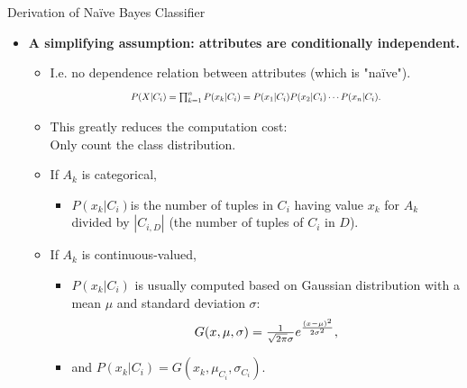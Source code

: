 \begin{frame}{Derivation of Naïve Bayes Classifier}
	\begin{itemize}
		\item \textbf{A simplifying assumption: attributes are {\color{airforceblue}conditionally independent}.}
		      \begin{itemize}
			      \item I.e. no dependence relation between attributes (which is "naïve").
			            \begin{align*}
				            \resizebox{7cm}{!}{%
					            $P(X|C_i) = \prod_{k=1}^{n} P(x_k|C_i) = P(x_1|C_i)P(x_2|C_i)\cdots P(x_n|C_i).$}
			            \end{align*}
			      \item This greatly reduces the computation cost:\\
			            Only count the class distribution.
			      \item If $A_k$ is categorical,
			            \begin{itemize}
				            \item $P(x_k|C_i)$is the number of tuples in $C_i$ having value $x_k$ for $A_k$ \\
				                  divided by $|C_{i,D}|$ (the number of tuples of $C_i$ in $D$).
			            \end{itemize}
			      \item If $A_k$ is continuous-valued,
			            \begin{itemize}
				            \item $P(x_k|C_i)$ is usually computed based on Gaussian distribution with a mean $\mu$ and standard deviation $\sigma$:
				                  \begin{align*}
					                  \resizebox{4cm}{!}{%
					                  $G(x,\mu,\sigma) = \frac{1}{\sqrt{2\pi}\sigma}e^{\frac{(x-\mu)^2}{2\sigma^2}},$}
				                  \end{align*}
				            \item and $P(x_k|C_i) = G(x_k,\mu_{C_i},\sigma_{C_i})$.
			            \end{itemize}
		      \end{itemize}
	\end{itemize}
\end{frame}

